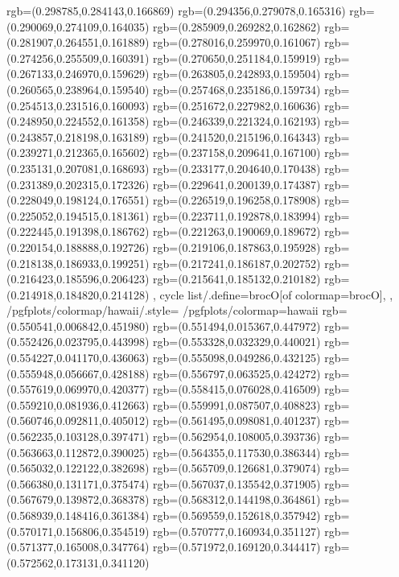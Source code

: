 {{{			rgb=(0.298785,0.284143,0.166869)
			rgb=(0.294356,0.279078,0.165316)
			rgb=(0.290069,0.274109,0.164035)
			rgb=(0.285909,0.269282,0.162862)
			rgb=(0.281907,0.264551,0.161889)
			rgb=(0.278016,0.259970,0.161067)
			rgb=(0.274256,0.255509,0.160391)
			rgb=(0.270650,0.251184,0.159919)
			rgb=(0.267133,0.246970,0.159629)
			rgb=(0.263805,0.242893,0.159504)
			rgb=(0.260565,0.238964,0.159540)
			rgb=(0.257468,0.235186,0.159734)
			rgb=(0.254513,0.231516,0.160093)
			rgb=(0.251672,0.227982,0.160636)
			rgb=(0.248950,0.224552,0.161358)
			rgb=(0.246339,0.221324,0.162193)
			rgb=(0.243857,0.218198,0.163189)
			rgb=(0.241520,0.215196,0.164343)
			rgb=(0.239271,0.212365,0.165602)
			rgb=(0.237158,0.209641,0.167100)
			rgb=(0.235131,0.207081,0.168693)
			rgb=(0.233177,0.204640,0.170438)
			rgb=(0.231389,0.202315,0.172326)
			rgb=(0.229641,0.200139,0.174387)
			rgb=(0.228049,0.198124,0.176551)
			rgb=(0.226519,0.196258,0.178908)
			rgb=(0.225052,0.194515,0.181361)
			rgb=(0.223711,0.192878,0.183994)
			rgb=(0.222445,0.191398,0.186762)
			rgb=(0.221263,0.190069,0.189672)
			rgb=(0.220154,0.188888,0.192726)
			rgb=(0.219106,0.187863,0.195928)
			rgb=(0.218138,0.186933,0.199251)
			rgb=(0.217241,0.186187,0.202752)
			rgb=(0.216423,0.185596,0.206423)
			rgb=(0.215641,0.185132,0.210182)
			rgb=(0.214918,0.184820,0.214128)
		},
	cycle list/.define={brocO}{[of colormap=brocO]},
	},
	/pgfplots/colormap/hawaii/.style={
		/pgfplots/colormap={hawaii}{%
			rgb=(0.550541,0.006842,0.451980)
			rgb=(0.551494,0.015367,0.447972)
			rgb=(0.552426,0.023795,0.443998)
			rgb=(0.553328,0.032329,0.440021)
			rgb=(0.554227,0.041170,0.436063)
			rgb=(0.555098,0.049286,0.432125)
			rgb=(0.555948,0.056667,0.428188)
			rgb=(0.556797,0.063525,0.424272)
			rgb=(0.557619,0.069970,0.420377)
			rgb=(0.558415,0.076028,0.416509)
			rgb=(0.559210,0.081936,0.412663)
			rgb=(0.559991,0.087507,0.408823)
			rgb=(0.560746,0.092811,0.405012)
			rgb=(0.561495,0.098081,0.401237)
			rgb=(0.562235,0.103128,0.397471)
			rgb=(0.562954,0.108005,0.393736)
			rgb=(0.563663,0.112872,0.390025)
			rgb=(0.564355,0.117530,0.386344)
			rgb=(0.565032,0.122122,0.382698)
			rgb=(0.565709,0.126681,0.379074)
			rgb=(0.566380,0.131171,0.375474)
			rgb=(0.567037,0.135542,0.371905)
			rgb=(0.567679,0.139872,0.368378)
			rgb=(0.568312,0.144198,0.364861)
			rgb=(0.568939,0.148416,0.361384)
			rgb=(0.569559,0.152618,0.357942)
			rgb=(0.570171,0.156806,0.354519)
			rgb=(0.570777,0.160934,0.351127)
			rgb=(0.571377,0.165008,0.347764)
			rgb=(0.571972,0.169120,0.344417)
			rgb=(0.572562,0.173131,0.341120)
}}}
